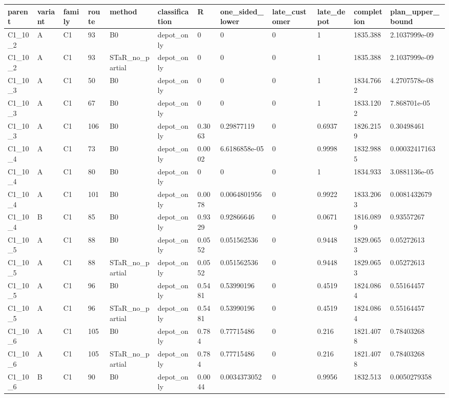 \begin{longtable}{llllllllllll}
\hline
parent & variant & family & route & method & classification & R & one\_sided\_lower & late\_customer & late\_depot & completion & plan\_upper\_bound \\
\hline
C1\_10\_2 & A & C1 & 93 & B0 & depot\_only & 0 & 0 & 0 & 1 & 1835.388 & 2.1037999e-09 \\
C1\_10\_2 & A & C1 & 93 & STaR\_no\_partial & depot\_only & 0 & 0 & 0 & 1 & 1835.388 & 2.1037999e-09 \\
C1\_10\_3 & A & C1 & 50 & B0 & depot\_only & 0 & 0 & 0 & 1 & 1834.7662 & 4.2707578e-08 \\
C1\_10\_3 & A & C1 & 67 & B0 & depot\_only & 0 & 0 & 0 & 1 & 1833.1202 & 7.868701e-05 \\
C1\_10\_3 & A & C1 & 106 & B0 & depot\_only & 0.3063 & 0.29877119 & 0 & 0.6937 & 1826.2159 & 0.30498461 \\
C1\_10\_4 & A & C1 & 73 & B0 & depot\_only & 0.0002 & 6.6186858e-05 & 0 & 0.9998 & 1832.9885 & 0.00032417163 \\
C1\_10\_4 & A & C1 & 80 & B0 & depot\_only & 0 & 0 & 0 & 1 & 1834.933 & 3.0881136e-05 \\
C1\_10\_4 & A & C1 & 101 & B0 & depot\_only & 0.0078 & 0.0064801956 & 0 & 0.9922 & 1833.2063 & 0.0081432679 \\
C1\_10\_4 & B & C1 & 85 & B0 & depot\_only & 0.9329 & 0.92866646 & 0 & 0.0671 & 1816.0899 & 0.93557267 \\
C1\_10\_5 & A & C1 & 88 & B0 & depot\_only & 0.0552 & 0.051562536 & 0 & 0.9448 & 1829.0653 & 0.05272613 \\
C1\_10\_5 & A & C1 & 88 & STaR\_no\_partial & depot\_only & 0.0552 & 0.051562536 & 0 & 0.9448 & 1829.0653 & 0.05272613 \\
C1\_10\_5 & A & C1 & 96 & B0 & depot\_only & 0.5481 & 0.53990196 & 0 & 0.4519 & 1824.0864 & 0.55164457 \\
C1\_10\_5 & A & C1 & 96 & STaR\_no\_partial & depot\_only & 0.5481 & 0.53990196 & 0 & 0.4519 & 1824.0864 & 0.55164457 \\
C1\_10\_6 & A & C1 & 105 & B0 & depot\_only & 0.784 & 0.77715486 & 0 & 0.216 & 1821.4078 & 0.78403268 \\
C1\_10\_6 & A & C1 & 105 & STaR\_no\_partial & depot\_only & 0.784 & 0.77715486 & 0 & 0.216 & 1821.4078 & 0.78403268 \\
C1\_10\_6 & B & C1 & 90 & B0 & depot\_only & 0.0044 & 0.0034373052 & 0 & 0.9956 & 1832.513 & 0.0050279358 \\

\end{longtable}
